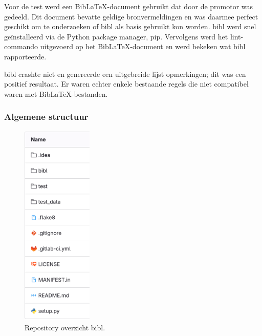Voor de test werd een BibLaTeX-document gebruikt dat door de promotor was gedeeld. Dit document bevatte geldige bronvermeldingen en was daarmee perfect geschikt om te onderzoeken of bibl als basis gebruikt kon worden. bibl werd snel geïnstalleerd via de Python package manager, pip. Vervolgens werd het lint-commando uitgevoerd op het BibLaTeX-document en werd bekeken wat bibl rapporteerde.

bibl crashte niet en genereerde een uitgebreide lijst opmerkingen; dit was een positief resultaat. Er waren echter enkele bestaande regels die niet compatibel waren met BibLaTeX-bestanden. 

\subsubsection{Algemene structuur}
\begin{figure}[ht]
    \centering
    \includegraphics[width=0.3\textwidth]{./files/bibl_repo.png}
    \caption[bibl repository]{Repository overzicht bibl.}
    \label{fig:bibl_repo}
\end{figure}


